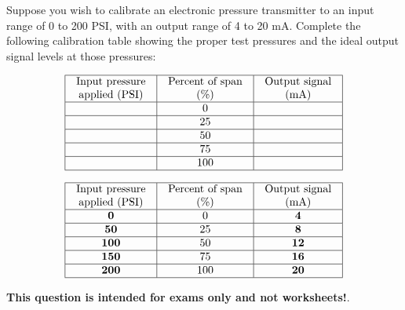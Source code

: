

Suppose you wish to calibrate an electronic pressure transmitter to an input range of 0 to 200 PSI, with an output range of 4 to 20 mA.  Complete the following calibration table showing the proper test pressures and the ideal output signal levels at those pressures:


$$\vbox{\offinterlineskip
\halign{\strut
\vrule \quad\hfil # \ \hfil & 
\vrule \quad\hfil # \ \hfil & 
\vrule \quad\hfil # \ \hfil \vrule \cr
\noalign{\hrule}
%
Input pressure & Percent of span & Output signal \cr
%
applied (PSI) & (\%) & (mA) \cr
%
\noalign{\hrule}
%
 & 0 &  \cr
%
\noalign{\hrule}
%
 & 25 &  \cr
%
\noalign{\hrule}
%
 & 50 &  \cr
%
\noalign{\hrule}
%
 & 75 &  \cr
%
\noalign{\hrule}
%
 & 100 &  \cr
%
\noalign{\hrule}
} %
}$$ %








$$\vbox{\offinterlineskip
\halign{\strut
\vrule \quad\hfil # \ \hfil & 
\vrule \quad\hfil # \ \hfil & 
\vrule \quad\hfil # \ \hfil \vrule \cr
\noalign{\hrule}
%
Input pressure & Percent of span & Output signal \cr
%
applied (PSI) & (\%) & (mA) \cr
%
\noalign{\hrule}
%
{\bf 0} & 0 & {\bf 4} \cr
%
\noalign{\hrule}
%
{\bf 50} & 25 & {\bf 8} \cr
%
\noalign{\hrule}
%
{\bf 100} & 50 & {\bf 12} \cr
%
\noalign{\hrule}
%
{\bf 150} & 75 & {\bf 16} \cr
%
\noalign{\hrule}
%
{\bf 200} & 100 & {\bf 20} \cr
%
\noalign{\hrule}
} %
}$$ %







{\bf This question is intended for exams only and not worksheets!}.



